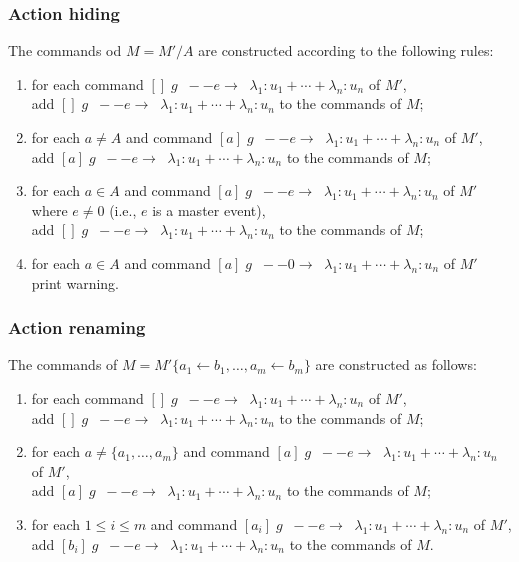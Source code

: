 \documentclass{article}
\newcommand{\arc}[1]{\;\;--{#1}\longrightarrow \;\;}
\begin{document}
\subsubsection*{Action hiding}

The commands od $M = M'/A$ are constructed according to the following rules:

\begin{enumerate}

	\item for each command $[] \; g \arc{e}   \lambda_1 : u_1 + \cdots + \lambda_n : u_n$ of $M'$, \\ 
	add	$[] \; g \arc{e}   \lambda_1 : u_1 + \cdots + \lambda_n : u_n$ to the commands of $M$;

	\item for each $a \neq A$ and command $[a] \; g \arc{e}   \lambda_1 : u_1 + \cdots + \lambda_n : u_n$ of $M'$, \\ 
	add	$[a] \; g \arc{e}   \lambda_1 : u_1 + \cdots + \lambda_n : u_n$ to the commands of $M$;

	\item for each $a \in A$ and command $[a] \; g \arc{e} \lambda_1 : u_1 + \cdots + \lambda_n : u_n$ of $M'$ where $e \neq 0$ (i.e., $e$ is a master event), \\
	add $[] \; g \arc{e} \lambda_1 : u_1 + \cdots + \lambda_n : u_n$ to the commands of $M$;
	\item for each $a \in A$ and command $[a] \; g \arc{0} \lambda_1 : u_1 + \cdots + \lambda_n : u_n$ of $M'$ print warning.
\end{enumerate}

\subsubsection*{Action renaming}

The commands of $M= M'\{a_1 \leftarrow b_1, \ldots, a_m \leftarrow b_m \}$ are constructed as follows:

\begin{enumerate}
	
	\item for each command $[] \; g \arc{e}   \lambda_1 : u_1 + \cdots + \lambda_n : u_n$ of $M'$, \\ 
	add	$[] \; g \arc{e}   \lambda_1 : u_1 + \cdots + \lambda_n : u_n$ to the commands of $M$;
	
	\item for each $a \neq \{a_1,\ldots,a_m\}$ and command $[a] \; g \arc{e}   \lambda_1 : u_1 + \cdots + \lambda_n : u_n$ of $M'$, \\ 
	add	$[a] \; g \arc{e}   \lambda_1 : u_1 + \cdots + \lambda_n : u_n$ to the commands of $M$;
	
	\item for each $1 \leq i \leq m$ and command $[a_i] \; g \arc{e} \lambda_1 : u_1 + \cdots + \lambda_n : u_n$ of $M'$, \\
	add $[b_i] \; g \arc{e} \lambda_1 : u_1 + \cdots + \lambda_n : u_n$ to the commands of $M$.
\end{enumerate}
\end{document}

